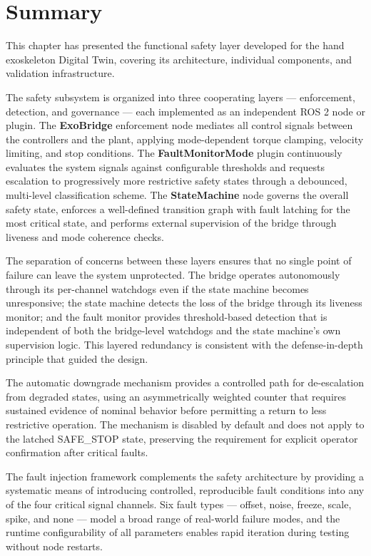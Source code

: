 \section{Summary}
This chapter has presented the functional safety layer developed for the hand exoskeleton Digital Twin, covering its architecture, individual components, and validation infrastructure.

The safety subsystem is organized into three cooperating layers — enforcement, detection, and governance — each implemented as an independent ROS 2 node or plugin. The \textbf{ExoBridge} enforcement node mediates all control signals between the controllers and the plant, applying mode-dependent torque clamping, velocity limiting, and stop conditions. The \textbf{FaultMonitorMode} plugin continuously evaluates the system signals against configurable thresholds and requests escalation to progressively more restrictive safety states through a debounced, multi-level classification scheme. The \textbf{StateMachine} node governs the overall safety state, enforces a well-defined transition graph with fault latching for the most critical state, and performs external supervision of the bridge through liveness and mode coherence checks.

The separation of concerns between these layers ensures that no single point of failure can leave the system unprotected. The bridge operates autonomously through its per-channel watchdogs even if the state machine becomes unresponsive; the state machine detects the loss of the bridge through its liveness monitor; and the fault monitor provides threshold-based detection that is independent of both the bridge-level watchdogs and the state machine's own supervision logic. This layered redundancy is consistent with the defense-in-depth principle that guided the design.

The automatic downgrade mechanism provides a controlled path for de-escalation from degraded states, using an asymmetrically weighted counter that requires sustained evidence of nominal behavior before permitting a return to less restrictive operation. The mechanism is disabled by default and does not apply to the latched SAFE\_STOP state, preserving the requirement for explicit operator confirmation after critical faults.

The fault injection framework complements the safety architecture by providing a systematic means of introducing controlled, reproducible fault conditions into any of the four critical signal channels. Six fault types — offset, noise, freeze, scale, spike, and none — model a broad range of real-world failure modes, and the runtime configurability of all parameters enables rapid iteration during testing without node restarts.

